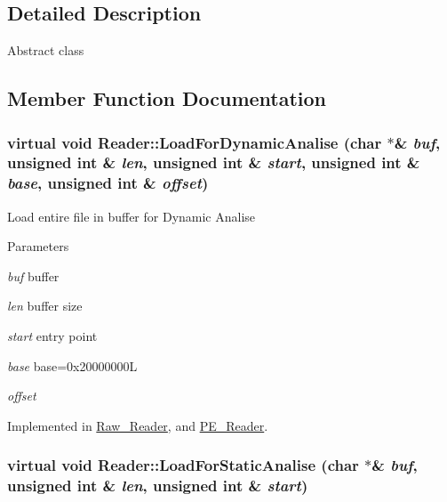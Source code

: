 \subsection{Detailed Description}
Abstract class 

\subsection{Member Function Documentation}
\hypertarget{classReader_a0fe4ac206880263e042c5277370c679b}{
\subsubsection[{LoadForDynamicAnalise}]{\setlength{\rightskip}{0pt plus 5cm}virtual void Reader::LoadForDynamicAnalise (char $\ast$\& {\em buf}, \/  unsigned int \& {\em len}, \/  unsigned int \& {\em start}, \/  unsigned int \& {\em base}, \/  unsigned int \& {\em offset})}}
\label{classReader_a0fe4ac206880263e042c5277370c679b}
Load entire file in buffer for Dynamic Analise 
\begin{DoxyParams}{Parameters}
\item[{\em buf}]buffer \item[{\em len}]buffer size \item[{\em start}]entry point \item[{\em base}]base=0x20000000L \item[{\em offset}]\end{DoxyParams}


Implemented in \hyperlink{classRaw__Reader_a9e9a6cafa1b830d5c05b7a5e720c656c}{Raw\_\-Reader}, and \hyperlink{classPE__Reader_ad11f69fdbf231385c9ff7edd26913af7}{PE\_\-Reader}.

\hypertarget{classReader_a48b1d822c048d481388fe05ff90b10f3}{
\subsubsection[{LoadForStaticAnalise}]{\setlength{\rightskip}{0pt plus 5cm}virtual void Reader::LoadForStaticAnalise (char $\ast$\& {\em buf}, \/  unsigned int \& {\em len}, \/  unsigned int \& {\em start})}}
\label{classReader_a48b1d822c048d481388fe05ff90b10f3}



